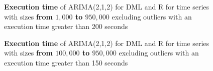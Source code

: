 \begin{figure}[ht]
	\centering
	\caption{\textbf{Execution time} of ARIMA(2,1,2) for DML and R for time series with sizes \textbf{from $1,000$ to $950,000$} excluding outliers with an execution time greater than 200 seconds}
    \label{fig:arima212-exectime-scatter-all}
\end{figure}


\begin{figure}[ht]
	\centering
	\caption{\textbf{Execution time} of ARIMA(2,1,2) for DML and R for time series with sizes \textbf{from $100,000$ to $950,000$} excluding outliers with an execution time greater than 150 seconds}
    \label{fig:arima212-exectime-scatter-all-excludeOutlier-regression}
\end{figure}
